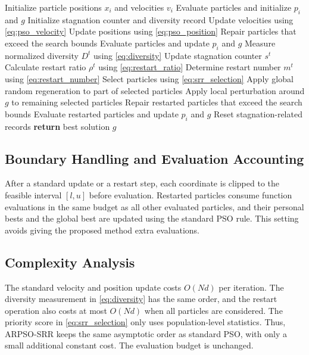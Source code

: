 \documentclass[conference]{IEEEtran}
\begin{document}
\begin{algorithm}[!t]
    \caption{ARPSO-SRR}
    \label{alg:arpso_srr}
    \begin{algorithmic}[1]
        \STATE Initialize particle positions $x_i$ and velocities $v_i$
        \STATE Evaluate particles and initialize $p_i$ and $g$
        \STATE Initialize stagnation counter and diversity record
        \STATE Update velocities using \eqref{eq:pso_velocity}
        \STATE Update positions using \eqref{eq:pso_position}
        \STATE Repair particles that exceed the search bounds
        \STATE Evaluate particles and update $p_i$ and $g$
        \STATE Measure normalized diversity $D^t$ using \eqref{eq:diversity}
        \STATE Update stagnation counter $s^t$
        \STATE Calculate restart ratio $\rho^t$ using \eqref{eq:restart_ratio}
        \STATE Determine restart number $m^t$ using \eqref{eq:restart_number}
        \STATE Select particles using \eqref{eq:srr_selection}
        \STATE Apply global random regeneration to part of selected particles
        \STATE Apply local perturbation around $g$ to remaining selected particles
        \STATE Repair restarted particles that exceed the search bounds
        \STATE Evaluate restarted particles and update $p_i$ and $g$
        \STATE Reset stagnation-related records
        \ENDIF
        \ENDWHILE
        \STATE \textbf{return} best solution $g$
    \end{algorithmic}
\end{algorithm}

\subsection{Boundary Handling and Evaluation Accounting}
After a standard update or a restart step, each coordinate is clipped to the feasible interval $[l,u]$ before evaluation. Restarted particles consume function evaluations in the same budget as all other evaluated particles, and their personal bests and the global best are updated using the standard PSO rule. This setting avoids giving the proposed method extra evaluations.

\subsection{Complexity Analysis}
The standard velocity and position update costs $O(Nd)$ per iteration. The diversity measurement in \eqref{eq:diversity} has the same order, and the restart operation also costs at most $O(Nd)$ when all particles are considered. The priority score in \eqref{eq:srr_selection} only uses population-level statistics. Thus, ARPSO-SRR keeps the same asymptotic order as standard PSO, with only a small additional constant cost. The evaluation budget is unchanged.
\end{document}
